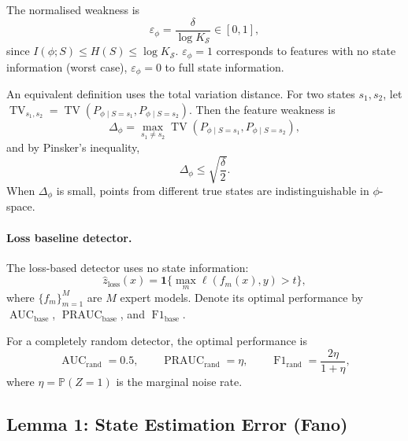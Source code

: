 The normalised weakness is
\begin{equation}
\varepsilon_\phi = \frac{\delta}{\log K_{\mathcal{S}}} \in [0, 1],
\label{eq:norm-weakness}
\end{equation}
since $I(\phi; S) \leq H(S) \leq \log K_{\mathcal{S}}$.
$\varepsilon_\phi = 1$ corresponds to features with no state information
(worst case), $\varepsilon_\phi = 0$ to full state information.

An equivalent definition uses the total variation distance. For two states
$s_1, s_2$, let
$\operatorname{TV}_{s_1,s_2} = \operatorname{TV}(P_{\phi \mid S=s_1},
P_{\phi \mid S=s_2})$. Then the feature weakness is
\begin{equation}
\Delta_\phi = \max_{s_1 \neq s_2}
\operatorname{TV}(P_{\phi \mid S=s_1}, P_{\phi \mid S=s_2}),
\label{eq:tv-weakness}
\end{equation}
and by Pinsker's inequality,
\begin{equation}
\Delta_\phi \leq \sqrt{\frac{\delta}{2}}.
\label{eq:pinsker-tv}
\end{equation}
When $\Delta_\phi$ is small, points from different true states are
indistinguishable in $\phi$-space.

\paragraph{Loss baseline detector.}
The loss-based detector uses no state information:
\[
\hat{z}_{\text{loss}}(x) = \mathbf{1}\{\max_m \ell(f_m(x), y) > t\},
\]
where $\{f_m\}_{m=1}^M$ are $M$ expert models. Denote its optimal performance
by $\operatorname{AUC}_{\text{base}}$,
$\operatorname{PRAUC}_{\text{base}}$, and $\operatorname{F1}_{\text{base}}$.

For a completely random detector, the optimal performance is
\begin{equation}
\operatorname{AUC}_{\text{rand}} = 0.5,\qquad
\operatorname{PRAUC}_{\text{rand}} = \eta,\qquad
\operatorname{F1}_{\text{rand}} = \frac{2\eta}{1+\eta},
\label{eq:random-baseline}
\end{equation}
where $\eta = \mathbb{P}(Z=1)$ is the marginal noise rate.

\subsection{Lemma 1: State Estimation Error (Fano)}
\label{sec:thm2:lemma1}

